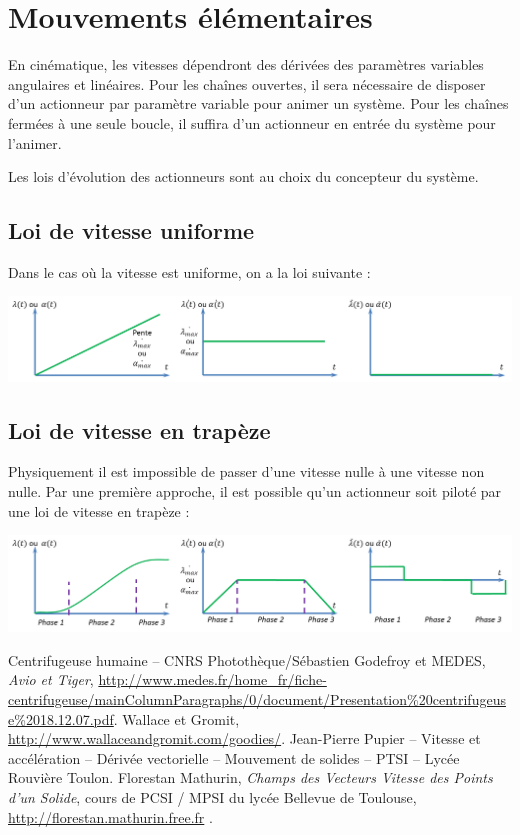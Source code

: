 \documentclass[10pt,oneside]{article}
\begin{document}
\section{Mouvements élémentaires}

En cinématique, les vitesses dépendront des dérivées des paramètres variables angulaires et linéaires. Pour les chaînes ouvertes, il sera nécessaire de disposer d'un actionneur par paramètre variable pour animer un système. Pour les chaînes fermées à une seule boucle, il suffira d'un actionneur en entrée du système pour l'animer.

Les lois d'évolution des actionneurs sont au choix du concepteur du système. 

\subsection{Loi de vitesse uniforme}
Dans le cas où la vitesse est uniforme, on a la loi suivante : 

\begin{center}
\includegraphics[width=.95\textwidth]{png/loi1}
\end{center}

\subsection{Loi de vitesse en trapèze}
Physiquement il est impossible de passer d'une vitesse nulle à une vitesse non nulle. Par une première approche, il est possible qu'un actionneur soit piloté par une loi de vitesse en trapèze :

\begin{center}
\includegraphics[width=.95\textwidth]{png/loi2}
\end{center}



\begin{thebibliography}{2}
 Centrifugeuse humaine -- CNRS Photothèque/Sébastien Godefroy et MEDES, \textit{Avio et Tiger}, \url{http://www.medes.fr/home_fr/fiche-centrifugeuse/mainColumnParagraphs/0/document/Presentation%20centrifugeuse%2018.12.07.pdf}.
 Wallace et Gromit, \url{http://www.wallaceandgromit.com/goodies/}.
 Jean-Pierre Pupier -- Vitesse et accélération -- Dérivée vectorielle -- Mouvement de solides -- PTSI -- Lycée Rouvière Toulon.
 Florestan Mathurin, \textit{Champs des Vecteurs Vitesse des Points d’un Solide}, cours de PCSI / MPSI du lycée Bellevue de Toulouse, \url{http://florestan.mathurin.free.fr} .
\end{thebibliography}
\end{document}
